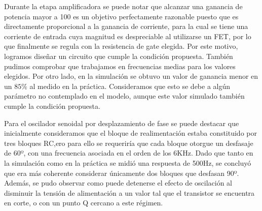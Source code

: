 \documentclass[a4paper, 10pt, spanish]{article}
\begin{document}
        Durante la etapa amplificadora se puede notar que alcanzar una ganancia de potencia mayor a 100 es un objetivo perfectamente razonable puesto que es directamente proporcional a la ganancia de corriente, para la cual se tiene una corriente de entrada cuya magnitud es despreciable al utilizarse un FET, por lo que finalmente se regula con la resistencia de gate elegida. Por este motivo, logramos diseñar un circuito que cumple la condición propuesta. También pudimos comprobar que trabajamos en frecuencias medias para los valores elegidos. Por otro lado, en la simulación se obtuvo un valor de ganancia menor en un $85\%$ al medido en la práctica. Consideramos que esto se debe a algún parámetro no contemplado en el modelo, aunque este valor simulado también cumple la condición propuesta.

        \medskip

        Para el oscilador senoidal por desplazamiento de fase se puede destacar que inicialmente consideramos que el bloque de realimentación estaba constituido por tres bloques RC,ero para ello se requeriría que cada bloque otorgue un desfasaje de 60º, con una frecuencia asociada en el orden de los 6KHz. Dado que tanto en la simulación como en la práctica se midió una respuesta de 500Hz, se concluyó que era más coherente considerar únicamente dos bloques que desfasan 90º. Además, se pudo observar como puede detenerse el efecto de oscilación al disminuir la tensión de alimentación a un valor tal que el transistor se encuentra en corte, o con un punto Q cercano a este régimen.






\end{document}
